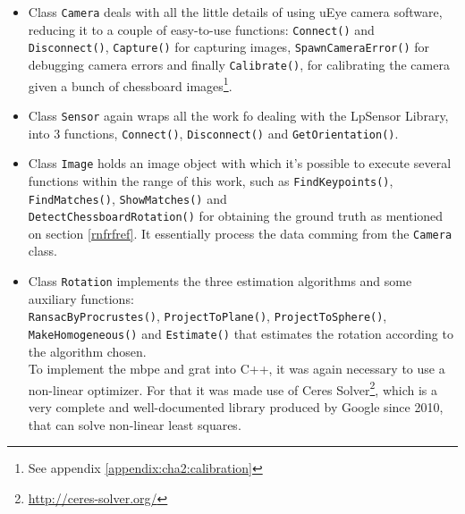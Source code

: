 \begin{itemize}
	\item Class \texttt{Camera} deals with all the little details of using uEye camera software, reducing it to a couple of easy-to-use functions: \texttt{Connect()} and \texttt{Disconnect()}, \texttt{Capture()} for capturing images, \texttt{SpawnCameraError()} for debugging camera errors and finally \texttt{Calibrate()}, for calibrating the camera given a bunch of chessboard images\footnote{See appendix \ref{appendix:cha2:calibration}}.
	
	\item Class \texttt{Sensor} again wraps all the work fo dealing with the LpSensor Library, into 3 functions, \texttt{Connect()}, \texttt{Disconnect()} and \texttt{GetOrientation()}.
	
	\item Class \texttt{Image} holds an image object with which it's possible to execute several functions within the range of this work, such as \texttt{FindKeypoints()}, \texttt{FindMatches()}, \texttt{ShowMatches()} and \\
	\texttt{DetectChessboardRotation()} for obtaining the ground truth as mentioned on section \ref{rnfrfref}. It essentially process the data comming from the \texttt{Camera} class.
	
	\item Class \texttt{Rotation} implements the three estimation algorithms and some auxiliary functions:\\ \texttt{RansacByProcrustes()},  \texttt{ProjectToPlane()}, \texttt{ProjectToSphere()}, \texttt{MakeHomogeneous()} and \texttt{Estimate()} that estimates the rotation according to the algorithm chosen.\\
	To implement the \acrshort{mbpe} and \acrshort{grat} into C++, it was again necessary to use a non-linear optimizer. For that it was made use of Ceres Solver\footnote{\href{http://ceres-solver.org/}{http://ceres-solver.org/}}, which is a very complete and well-documented library produced by Google since 2010, that can solve non-linear least squares.
	
\end{itemize}




















